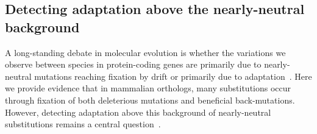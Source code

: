 \documentclass{article}
\begin{document}

    \subsection*{Detecting adaptation above the nearly-neutral background}

    A long-standing debate in molecular evolution is whether the variations we observe between species in protein-coding genes are primarily due to nearly-neutral mutations reaching fixation by drift or primarily due to adaptation~\cite{kimura_evolutionary_1968,jensen_importance_2019,gillespie_substitution_1994,Ohta1992}.
    Here we provide evidence that in mammalian orthologs, many substitutions occur through fixation of both deleterious mutations and beneficial back-mutations.
    However, detecting adaptation above this background of nearly-neutral substitutions remains a central question~\cite{kimura_evolutionary_1968,ohta_development_1996}.
\end{document}

